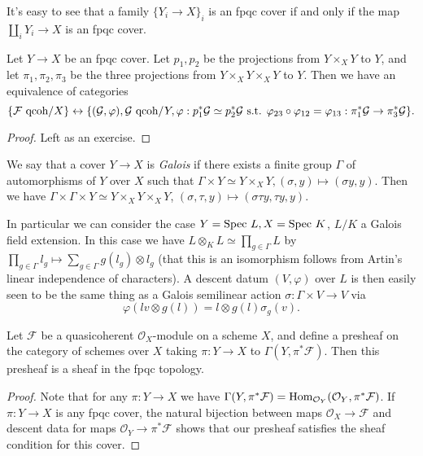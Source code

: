 \begin{rem} It's easy to see that a family $\{Y_i \rightarrow X\}_i$ is an fpqc cover if and only if the map $\coprod_i Y_i \rightarrow X$ is an fpqc cover.
\end{rem}

\begin{cor} Let $Y\rightarrow X$ be an fpqc cover. Let $p_1, p_2$ be the projections from $Y\times_X Y$ to $Y$, and let $\pi_1, \pi_2, \pi_3$ be the three projections from $Y\times_XY\times_XY$ to $Y$. Then we have an equivalence of categories
\[
\{\mathcal{F}\mbox{\rm{ qcoh}}/X\}\leftrightarrow\{(\mathcal{G},\varphi), \mathcal{G}\mbox{\rm{ qcoh}}/Y, \varphi:p_1^*\mathcal{G}\simeq p_2^*\mathcal{G} \mbox{ s.t. } \varphi_{23}\circ\varphi_{12} = \varphi_{13}:\pi_1^*\mathcal{G}\rightarrow\pi_3^*\mathcal{G}\}.
\]
\end{cor}
\begin{proof} Left as an exercise.
\end{proof}

\begin{ex} We say that a cover $Y \rightarrow X$ is \emph{Galois} if there exists a finite group $\Gamma$ of automorphisms of $Y$ over $X$ such that $\Gamma\times Y \simeq Y\times_XY, (\sigma,y)\mapsto(\sigma y,y)$. Then we have $\Gamma\times\Gamma\times Y\simeq Y\times_XY\times_XY$, $(\sigma,\tau,y) \mapsto (\sigma\tau y,\tau y,y)$.

In particular we can consider the case $Y = \mbox{\rm Spec }L, X = \mbox{\rm Spec }K$, $L/K$ a Galois field extension. In this case we have $L\otimes_KL \simeq \prod_{g\in\Gamma} L$ by $\prod_{g\in\Gamma} l_g \mapsto \sum_{g\in\Gamma}g(l_g)\otimes l_g$ (that this is an isomorphism follows from Artin's linear independence of characters). A descent datum $(V, \varphi)$ over $L$ is then easily seen to be the same thing as a Galois semilinear action $\sigma:\Gamma\times V\rightarrow V$ via
\[
\varphi(lv\otimes g(l)) = l\otimes g(l)\sigma_g(v).
\]
\end{ex}

\begin{thm} Let $\mathcal{F}$ be a quasicoherent $\mathcal{O}_X$-module on a scheme $X$, and define a presheaf on the category of schemes over $X$ taking $\pi:Y\rightarrow X$ to $\Gamma(Y,\pi^*\mathcal{F})$. Then this presheaf is a sheaf in the fpqc topology.
\end{thm}
\begin{proof} Note that for any $\pi:Y\rightarrow X$ we have $\Gamma(Y,\pi^*\mathcal{F}) = \mbox{\rm Hom}_{\mathcal{O}_Y}(\mathcal{O}_Y,\pi^*\mathcal{F})$. If $\pi: Y\rightarrow X$ is any fpqc cover, the natural bijection between maps $\mathcal{O}_X \rightarrow \mathcal{F}$ and descent data for maps $\mathcal{O}_Y\rightarrow \pi^*\mathcal{F}$ shows that our presheaf satisfies the sheaf condition for this cover.
\end{proof}

